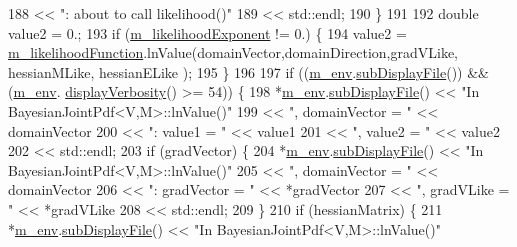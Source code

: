 \begin{DoxyCode}
188                             << \textcolor{stringliteral}{": about to call likelihood()"}
189                             << std::endl;
190   \}
191 
192   \textcolor{keywordtype}{double} value2 = 0.;
193   \textcolor{keywordflow}{if} (\hyperlink{class_q_u_e_s_o_1_1_bayesian_joint_pdf_a511b1e403ebcab436177491ea8f21c07}{m\_likelihoodExponent} != 0.) \{
194     value2 = \hyperlink{class_q_u_e_s_o_1_1_bayesian_joint_pdf_a8e2506801de447f8acd187f8edfa330d}{m\_likelihoodFunction}.lnValue(domainVector,domainDirection,gradVLike, 
      hessianMLike, hessianELike );
195   \}
196 
197   \textcolor{keywordflow}{if} ((\hyperlink{class_q_u_e_s_o_1_1_base_scalar_function_adf44141aeb765d97613286f88f235f04}{m\_env}.\hyperlink{class_q_u_e_s_o_1_1_base_environment_a8a0064746ae8dddfece4229b9ad374d6}{subDisplayFile}()) && (\hyperlink{class_q_u_e_s_o_1_1_base_scalar_function_adf44141aeb765d97613286f88f235f04}{m\_env}.
      \hyperlink{class_q_u_e_s_o_1_1_base_environment_a1fe5f244fc0316a0ab3e37463f108b96}{displayVerbosity}() >= 54)) \{
198     *\hyperlink{class_q_u_e_s_o_1_1_base_scalar_function_adf44141aeb765d97613286f88f235f04}{m\_env}.\hyperlink{class_q_u_e_s_o_1_1_base_environment_a8a0064746ae8dddfece4229b9ad374d6}{subDisplayFile}() << \textcolor{stringliteral}{"In BayesianJointPdf<V,M>::lnValue()"}
199                             << \textcolor{stringliteral}{", domainVector = "} << domainVector
200                             << \textcolor{stringliteral}{": value1 = "}       << value1
201                             << \textcolor{stringliteral}{", value2 = "}       << value2
202                             << std::endl;
203     \textcolor{keywordflow}{if} (gradVector) \{
204       *\hyperlink{class_q_u_e_s_o_1_1_base_scalar_function_adf44141aeb765d97613286f88f235f04}{m\_env}.\hyperlink{class_q_u_e_s_o_1_1_base_environment_a8a0064746ae8dddfece4229b9ad374d6}{subDisplayFile}() << \textcolor{stringliteral}{"In BayesianJointPdf<V,M>::lnValue()"}
205                               << \textcolor{stringliteral}{", domainVector = "} << domainVector
206                               << \textcolor{stringliteral}{": gradVector = "}   << *gradVector
207                               << \textcolor{stringliteral}{", gradVLike = "}    << *gradVLike
208                               << std::endl;
209     \}
210     \textcolor{keywordflow}{if} (hessianMatrix) \{
211       *\hyperlink{class_q_u_e_s_o_1_1_base_scalar_function_adf44141aeb765d97613286f88f235f04}{m\_env}.\hyperlink{class_q_u_e_s_o_1_1_base_environment_a8a0064746ae8dddfece4229b9ad374d6}{subDisplayFile}() << \textcolor{stringliteral}{"In BayesianJointPdf<V,M>::lnValue()"}

\end{DoxyCode}
